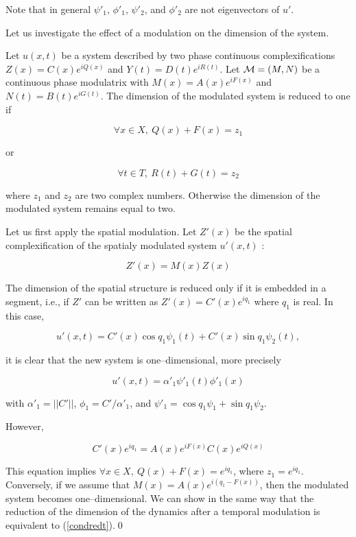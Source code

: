 Note that in general $\psi'_1$, $\phi'_1$, $\psi'_2$, and $\phi'_2$
are not eigenvectors of $u'$.

\medskip

Let us investigate the effect of a modulation on the dimension of 
the system.

%

\begin{thm}\label{thmdim}
Let $u(x,t)$ be a system described by two phase continuous 
complexifications $Z(x)=C(x)e^{iQ(x)}$ and $Y(t)=D(t)e^{iR(t)}$.
Let ${\cal M}=(M,N)$ be a continuous phase modulatrix with 
$M(x)= A(x)e^{iF(x)}$ and $N(t)=B(t)e^{iG(t)}$. The dimension of
the modulated system is reduced to one if

\begin{equation}
\forall x \in X, \ Q(x)+F(x)=z_1
\end{equation}

or 

\begin{equation}
\forall t \in T, \ R(t)+G(t)=z_2
\label{condredt}
\end{equation}

where $z_1$ and $z_2$ are two complex numbers. Otherwise the
dimension of the modulated system remains equal to two.
\end{thm}
 
\begin{pf}
Let us first  apply the spatial modulation. 
Let $Z'(x)$ be the spatial complexification of the spatialy modulated
system $u'(x,t)$ :

\begin{equation}
Z'(x)=M(x)Z(x)
\end{equation}

The dimension of the spatial structure is reduced only if it
 is embedded in a segment, i.e., if $Z'$ can be written as 
$Z'(x)=C'(x)e^{iq_1}$ where $q_1$ is real. 
In this case,

\begin{equation}
u'(x,t)=C'(x)\cos q_1 \psi_1(t)+C'(x)\sin q_1 \psi_2(t),
\end{equation}

it is clear that the new system is one--dimensional, 
more precisely

\begin{equation}
u'(x,t)=\alpha'_1\psi'_1(t)\phi'_1(x)
\end{equation}

with $\alpha'_1=||C'||$, $\phi_1=C'/\alpha'_1$, and $\psi'_1=
\cos q_1 \psi_1+\sin q_1 \psi_2$.

\medskip

However,

\begin{equation}
C'(x)e^{iq_1}=A(x)e^{iF(x)}C(x)e^{iQ(x)}
\end{equation}

This equation implies $\forall x \in X,\ Q(x)+F(x)=e^{iq_1}$, where
$z_1=e^{iq_1}$. Conversely, if we assume that $M(x)=A(x)e^{i(q_1-F(x))}$,
then the modulated system becomes one--dimensional.
We can show in the same way that the reduction of the dimension
of the dynamics after a temporal modulation is equivalent to 
(\ref{condredt}).\qed\end{pf}

